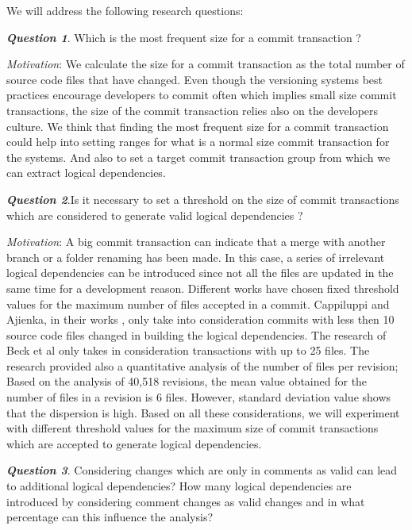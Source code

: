 \documentclass[a4paper,twoside]{article}
\begin{document}
We will address the following research questions:

\textit{\textbf{Question 1}}. Which is the most frequent size for a commit transaction ?  

\textit{Motivation}: We calculate the size for a commit transaction as the total number of source code files that have changed. Even though the versioning systems best practices encourage developers to commit often which implies small size commit transactions, the size of the commit transaction relies also on the developers culture. We think that finding the most frequent size for a commit transaction could help into setting ranges for what is a normal size commit transaction for the systems. And also to set a target commit transaction group from which we can extract logical dependencies.

\textit{\textbf{Question 2}}.Is it necessary to set a threshold on the size of commit transactions which are considered to generate valid logical dependencies ?

\textit{Motivation}: A big commit transaction can indicate that a merge with another branch or a folder renaming has been made. In this case, a series of irrelevant logical dependencies can be introduced since not all the files are updated in the same time for a development reason. Different works have chosen fixed threshold values for the maximum number of files accepted in a commit. Cappiluppi and Ajienka, in their works \cite{DBLP:journals/jss/AjienkaC17}, \cite{DBLP:journals/ese/AjienkaCC18} only take into consideration commits with less then 10 source code files changed in building the logical dependencies. The research of Beck et al \cite{Beck:2011:CMC:2025113.2025162} only takes in consideration transactions with up to 25 files. The research \cite{Oliva:2011:ISL:2067853.2068086} provided also a quantitative analysis of the number of files per revision; Based on the analysis of  40,518 revisions, the mean value obtained for the number of files in a revision is 6 files. However, standard deviation value shows that the dispersion is high. Based on all these considerations, we will experiment with different threshold values for the maximum size of commit transactions which are accepted to generate logical dependencies.


\textit{\textbf{Question 3}}. Considering changes which are only in comments as valid can lead to additional logical dependencies? How many logical dependencies are introduced by considering comment changes as valid changes and in what percentage can this influence the analysis?
\end{document}
